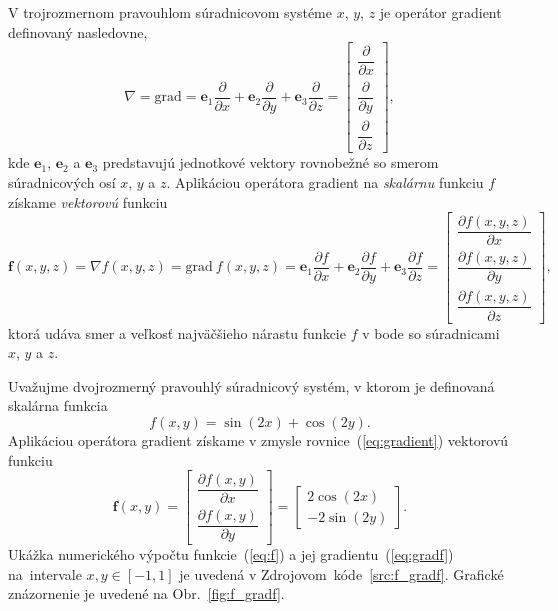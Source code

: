 \documentclass[a4paper, 12pt]{book}
\newcommand{\grad}{\mathrm{grad}}
\let\vec\mathbf
\begin{document}
V trojrozmernom pravouhlom súradnicovom systéme $x$, $y$, $z$ je operátor 
gradient definovaný nasledovne,
%
\begin{equation}
\label{eq:gradient}
\nabla = \grad = \vec e_1 \frac{\partial}{\partial x} + \vec e_2 
\frac{\partial}{\partial y} + \vec e_3 \frac{\partial}{\partial z} =
\begin{bmatrix}
\dfrac{\partial}{\partial x} \\[2ex]
\dfrac{\partial}{\partial y} \\[2ex]
\dfrac{\partial}{\partial z}
\end{bmatrix}
{,}
\end{equation}
%
kde $\vec e_1$, $\vec e_2$ a $\vec e_3$ predstavujú jednotkové vektory 
rovnobežné so smerom súradnicových osí $x$, $y$ a $z$.  Aplikáciou operátora 
gradient na \emph{skalárnu} funkciu $f$ získame \emph{vektorovú} funkciu
%
\begin{equation}
\vec f(x, y, z) = \nabla f(x, y, z) = \grad \ f(x, y, z) = \vec e_1 
\frac{\partial f}{\partial x} + \vec e_2 \frac{\partial f}{\partial y} + \vec 
e_3 \frac{\partial f}{\partial z} =
\begin{bmatrix}
\dfrac{\partial f(x, y, z)}{\partial x} \\[2ex]
\dfrac{\partial f(x, y, z)}{\partial y} \\[2ex]
\dfrac{\partial f(x, y, z)}{\partial z}
\end{bmatrix}
{,}
\end{equation}
%
ktorá udáva smer a veľkosť najväčšieho nárastu funkcie $f$ v bode so 
súradnicami $x$, $y$ a $z$.

Uvažujme dvojrozmerný pravouhlý súradnicový systém, v ktorom je definovaná 
skalárna funkcia
%
\begin{equation}
\label{eq:f}
f(x, y) = \sin(2x) + \cos(2y){.}
\end{equation}
%
Aplikáciou operátora gradient získame v zmysle rovnice~(\ref{eq:gradient}) 
vektorovú funkciu
%
\begin{equation}
\label{eq:gradf}
\vec f(x, y) =
\begin{bmatrix}
\dfrac{\partial f(x, y)}{\partial x} \\[2ex]
\dfrac{\partial f(x, y)}{\partial y}
\end{bmatrix}
=
\begin{bmatrix}
2 \cos(2x) \\[2ex]
-2 \sin(2y)
\end{bmatrix}
{.}
\end{equation}
%
Ukážka numerického výpočtu funkcie~(\ref{eq:f}) a jej 
gradientu~(\ref{eq:gradf}) na~intervale $x, y \in [-1, 1]$ je uvedená 
v Zdrojovom~kóde~\ref{src:f_gradf}.  Grafické znázornenie je uvedené na 
Obr.~\ref{fig:f_gradf}.
\end{document}
